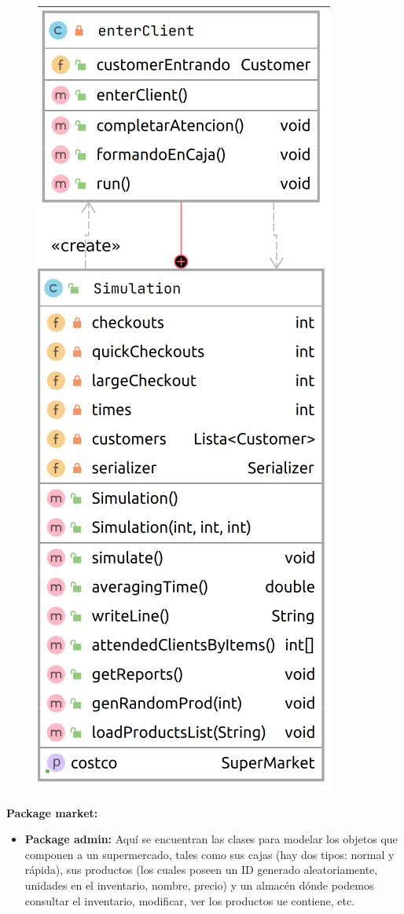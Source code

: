 \documentclass[letterpaper,11pt]{article}
\begin{document}
\begin{figure}[htb]
	\centering
	\includegraphics[scale=.37]{sim_diagram.png}
\end{figure}
\textbf{Package market: }
\begin{itemize}
	\item \textbf{Package admin: } Aquí se encuentran las clases para modelar los objetos que componen a un supermercado, tales como sus cajas (hay dos tipos: normal y rápida), sus productos (los cuales poseen un ID generado aleatoriamente, unidades en el inventario, nombre, precio) y un almacén dónde podemos consultar el inventario, modificar, ver los productos ue contiene, etc. 
\end{itemize}
\end{document}
